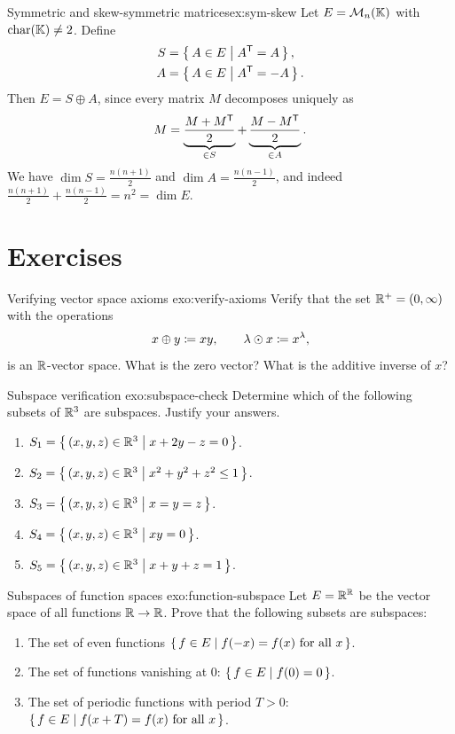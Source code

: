 \begin{example}{Symmetric and skew-symmetric matrices}{ex:sym-skew}
Let $E = \mathcal{M}_n({\mathbb{K}})$ with $\operatorname{char}({\mathbb{K}})\neq 2$. Define
\begin{align*}
  S &= \left\{\,A\in E\;\middle|\;{A}^{\mathsf{T}}=A\,\right\}, \\
  A &= \left\{\,A\in E\;\middle|\;{A}^{\mathsf{T}}=-A\,\right\}.
\end{align*}
Then $E = S\oplus A$, since every matrix $M$ decomposes uniquely as
\[
  M = \underbrace{\frac{M+{M}^{\mathsf{T}}}{2}}_{\in S}
    + \underbrace{\frac{M-{M}^{\mathsf{T}}}{2}}_{\in A}.
\]
We have $\dim S = \frac{n(n+1)}{2}$ and $\dim A = \frac{n(n-1)}{2}$,
and indeed $\frac{n(n+1)}{2}+\frac{n(n-1)}{2}=n^2=\dim E$.
\end{example}


\section{Exercises}\label{sec:ch1-exercises}

\begin{exercise}{Verifying vector space axioms \basic}{exo:verify-axioms}
Verify that the set ${\mathbb{R}}^+ = (0,\infty)$ with the operations
\[
  x\oplus y \coloneqq xy, \qquad \lambda\odot x \coloneqq x^\lambda,
\]
is an ${\mathbb{R}}$-vector space. What is the zero vector? What is the additive
inverse of $x$?
\end{exercise}

\begin{exercise}{Subspace verification \basic}{exo:subspace-check}
Determine which of the following subsets of ${\mathbb{R}}^3$ are subspaces. Justify
your answers.
\begin{enumerate}[label=(\alph*)]
  \item $S_1 = \left\{\,(x,y,z)\in{\mathbb{R}}^3\;\middle|\;x+2y-z=0\,\right\}$.
  \item $S_2 = \left\{\,(x,y,z)\in{\mathbb{R}}^3\;\middle|\;x^2+y^2+z^2\leq 1\,\right\}$.
  \item $S_3 = \left\{\,(x,y,z)\in{\mathbb{R}}^3\;\middle|\;x=y=z\,\right\}$.
  \item $S_4 = \left\{\,(x,y,z)\in{\mathbb{R}}^3\;\middle|\;xy=0\,\right\}$.
  \item $S_5 = \left\{\,(x,y,z)\in{\mathbb{R}}^3\;\middle|\;x+y+z=1\,\right\}$.
\end{enumerate}
\end{exercise}

\begin{exercise}{Subspaces of function spaces \basic}{exo:function-subspace}
Let $E = {\mathbb{R}}^{\mathbb{R}}$ be the vector space of all functions ${\mathbb{R}}\to{\mathbb{R}}$. Prove
that the following subsets are subspaces:
\begin{enumerate}[label=(\alph*)]
  \item The set of even functions $\left\{\,f\in E\;\middle|\;f(-x)=f(x)
    \text{ for all } x\,\right\}$.
  \item The set of functions vanishing at $0$:
    $\left\{\,f\in E\;\middle|\;f(0)=0\,\right\}$.
  \item The set of periodic functions with period $T>0$:
    $\left\{\,f\in E\;\middle|\;f(x+T)=f(x) \text{ for all } x\,\right\}$.
\end{enumerate}
\end{exercise}


